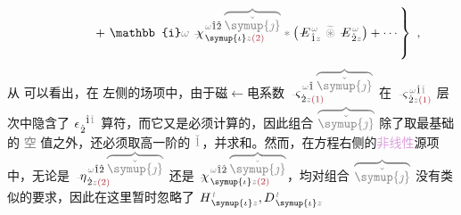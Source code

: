 \begin{subequations}
\begin{align}
	&~~~~~~~~~~~~~~~ +\left. \mathbb{i} \mathcolor{gray}{\omega} ~\Xint{{}^{}_{\mathcolor{gray}{-}}}{23}{\chi}^{\;\! \mathcolor{gray}{\omega} \hat{1} \hat{2} \;\! \mathcolor{gray}{\overbrace{\check{\symup{\jmath}}}}}_{\;\! \symup{\iota} \mathcolor{gray}{z} \textcolor{Maroon}{(2)}} \mathcolor{gray}{*} \left( \Xint{\mathcolor{gray}{-}}{295}{E}^{\;\!\mathcolor{gray}{\omega}}_{\;\! \hat{1} \mathcolor{gray}{z}} ~\mathcolor{gray}{\widetilde \circledast}~ \Xint{\mathcolor{gray}{-}}{295}{E}^{\;\!\mathcolor{gray}{\omega}}_{\;\! \hat{2} \mathcolor{gray}{z}} \right) + \cdots \right\}~,
\end{align}
\end{subequations}
\clearpage
从  可以看出，在  左侧的场项中，由于\textcolor{NavyBlue}{磁$\longleftarrow$电}系数 $\Xint{\begin{smallmatrix} ~ \\ {}^{}_{\mathcolor{gray}{-}} \\ ~ \end{smallmatrix}}{13}{\varsigma}^{\;\! \mathcolor{gray}{\omega} \hat{1} \;\! \mathcolor{gray}{\overbrace{\check{\symup{\jmath}}}}}_{\;\! \dot{2} \mathcolor{gray}{z} \textcolor{Maroon}{(1)}}$ 在 $\Xint{\begin{smallmatrix} ~ \\ {}^{}_{\mathcolor{gray}{-}} \\ ~ \end{smallmatrix}}{13}{\varsigma}^{\;\! \mathcolor{gray}{\omega} \hat{1} \mathcolor{gray}{\check{1}}}_{\;\! \dot{2} \mathcolor{gray}{z} \textcolor{Maroon}{(1)}}$ 层次中隐含了 $\epsilon^{\;\! \hphantom{\dot{2}} \hat{1} \mathcolor{gray}{\check{1}}}_{\;\! \dot{2}}$ 算符，而它又是必须计算的，因此组合 $\mathcolor{gray}{\overbrace{\check{\symup{\jmath}}}}$ 除了取最基础的 \textcolor{gray}{空} 值之外，还必须取高一阶的 $\mathcolor{gray}{\check{1}}$，并求和。然而，在方程右侧的\textcolor{Plum}{非线性}源项中，无论是 $\Xint{\begin{smallmatrix} ~ \\ {}^{}_{\mathcolor{gray}{-}} \\ ~ \end{smallmatrix}}{17}{\eta}^{\;\! \mathcolor{gray}{\omega} \hat{1} \hat{2} \;\! \mathcolor{gray}{\overbrace{\check{\symup{\jmath}}}}}_{\;\! \dot{2} \mathcolor{gray}{z} \textcolor{Maroon}{(2)}}$ 还是 $\Xint{{}^{}_{\mathcolor{gray}{-}}}{23}{\chi}^{\;\! \mathcolor{gray}{\omega} \hat{1} \hat{2} \;\! \mathcolor{gray}{\overbrace{\check{\symup{\jmath}}}}}_{\;\! \symup{\iota} \mathcolor{gray}{z} \textcolor{Maroon}{(2)}}$，均对组合 $\mathcolor{gray}{\overbrace{\check{\symup{\jmath}}}}$ 没有类似的要求，因此在这里暂时忽略了 $H^{\;\!\mathcolor{gray}{t}}_{\;\! \symup{\iota}\mathcolor{gray}{z}}, D^{\;\!\mathcolor{gray}{t}}_{\;\! \symup{\iota}\mathcolor{gray}{z}}$ 
